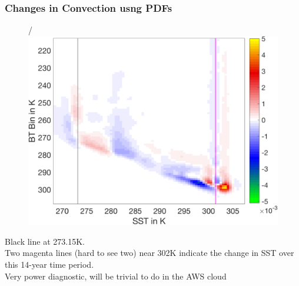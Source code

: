 \documentclass[10pt,t]{beamer}
\begin{document}
\begin{frame}
  \frametitle{Changes in Convection usng PDFs}

  \vspace{-0.4in}

  \begin{figure}
  \hspace*{0.2in}
/  {\includegraphics[width=0.5\linewidth]{./Figs17/pdf_rates_1231_ocean_vs_sst_with_hot_lat_delta_lines.png}}
\end{figure}

Black line at 273.15K.\\
\vspace{0.1in}Two magenta lines (hard to see two) near 302K indicate the
change in SST over this 14-year time period.\\
\vspace{0.1in} Very power diagnostic, will be trivial to do in the AWS cloud


\end{frame}
\end{document}
